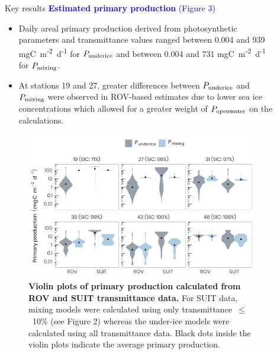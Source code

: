 \documentclass[final]{beamer}
\newlength{\sepwidth}
\newlength{\colwidth}
\newcommand{\separatorcolumn}{\begin{column}{\sepwidth}\end{column}}
\newcommand{\ppopenwater}{\ensuremath{P_{\text{\scriptsize openwater}}}}
\newcommand{\ppmixing}{\ensuremath{P_{\text{\scriptsize mixing}}}}
\newcommand{\ppunderice}{\ensuremath{P_{\text{\scriptsize underice}}}}
\newcommand{\dailypp}{mgC~m\textsuperscript{-2}~d\textsuperscript{-1}}
\begin{document}
\begin{frame}[t]
\begin{columns}[t]
\begin{column}{\colwidth}
\begin{block}{Key results}
				\textcolor{blue}{\large \textbf{Estimated primary production} (Figure 3)}
				\begin{itemize}
					\justifying
					\setlength\itemsep{2.5em}
					\item Daily areal primary production derived from photosynthetic parameters and transmittance values ranged between 0.004 and 939 \dailypp{} for \ppunderice{} and between 0.004 and 731 \dailypp{} for \ppmixing{}.
					\item At stations 19 and 27, greater differences between \ppunderice{} and \ppmixing{} were observed in ROV-based estimates due to lower sea ice concentrations which allowed for a greater weight of \ppopenwater{} on the calculations.
				\end{itemize}

				\vspace{-25mm}
				\begin{figure}
					\centering
					\includegraphics[scale = 1.75]{graphs/fig5.pdf}
					\caption{\textbf{Violin plots of primary production calculated from ROV and SUIT transmittance data.} For SUIT data, mixing models were calculated using only transmittance~$\le$~10\% (see Figure 2) whereas the under-ice models were calculated using all transmittance data. Black dots inside the violin plots indicate the average primary production.}
				\end{figure}

			\end{block}

		\end{column}

		\separatorcolumn

		\begin{column}{\colwidth}


\end{column}
\end{columns}
\end{frame}
\end{document}
